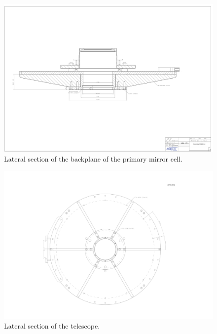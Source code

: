\begin{figure}
\begin{center}
\includegraphics[height=1.0\linewidth,angle=90]{figures/telescope-primary-mirror-cell-backplane-section}
\end{center}
\caption{Lateral section of the backplane of the primary mirror cell.}
\end{figure}

\begin{figure}
\begin{center}
\includegraphics[height=1.0\linewidth,angle=90]{figures/telescope-primary-mirror-cell-rear}
\end{center}
\caption{Lateral section of the telescope.}
\end{figure}

